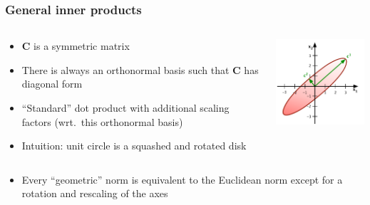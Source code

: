 \begin{frame}
  \frametitle{General inner products} 
  
  \begin{columns}[T]
    \begin{column}{50mm}
      \begin{itemize}\gap
      \item $\mathbf{C}$ is a symmetric matrix
      \item There is always an orthonormal basis such that $\mathbf{C}$ has
        diagonal form
      \item ``Standard'' dot product with additional scaling factors
        (wrt.\ this orthonormal basis)
      \item Intuition: unit circle is a squashed and rotated disk
      \end{itemize}
    \end{column}
    \begin{column}{50mm}
      \includegraphics[width=50mm]{img/2_inner_product_2}
    \end{column}
  \end{columns}
  \begin{itemize}
  \item<2->[\So] Every ``geometric'' norm is equivalent to the Euclidean norm
    except for a rotation and rescaling of the axes
  \end{itemize}
\end{frame}

